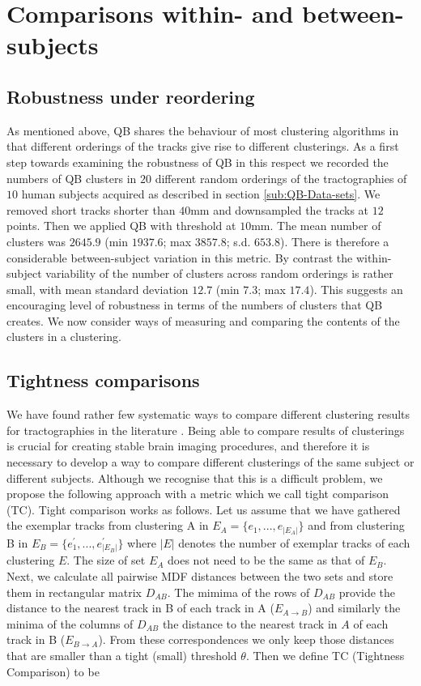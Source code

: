 \documentclass[preprint,authoryear,a4paper,10pt,onecolumn]{elsarticle}
\begin{document}
\section{Comparisons within- and between-subjects\label{sub:Comparisons}}

\subsection{Robustness under reordering}

As mentioned above, QB shares the behaviour of most clustering
algorithms in that different orderings of the tracks give rise to
different clusterings.  As a first step towards examining the robustness
of QB in this respect we recorded the numbers of QB clusters in $20$
different random orderings of the tractographies of $10$ human subjects
acquired as described in section \ref{sub:QB-Data-sets}. We removed
short tracks shorter than $40$mm and downsampled the tracks at $12$
points. Then we applied QB with threshold at $10$mm. The mean number of
clusters was $2645.9$ (min $1937.6$; max $3857.8$; s.d. $653.8$). There
is therefore a considerable between-subject variation in this metric. By
contrast the within-subject variability of the number of clusters across
random orderings is rather small, with mean standard deviation $12.7$
(min $7.3$; max $17.4$). This suggests an encouraging level of
robustness in terms of the numbers of clusters that QB creates. We now
consider ways of measuring and comparing the contents of the clusters in
a clustering.


\subsection{Tightness comparisons\label{sub:Tightness-comparisons-1}}

We have found rather few systematic ways to compare different clustering
results for tractographies in the literature
\citep{moberts2005evaluation}.  Being able to compare results of
clusterings is crucial for creating stable brain imaging procedures, and
therefore it is necessary to develop a way to compare different
clusterings of the same subject or different subjects. Although we
recognise that this is a difficult problem, we propose the following
approach with a metric which we call tight comparison (TC). Tight
comparison works as follows. Let us assume that we have gathered the
exemplar tracks from clustering A in $E_{A}=\{e_{1},...,e_{|E_{A}|}\}$
and from clustering B in $E_{B}=\{e_{1}^{'},...,e_{|E_{B}|}^{'}\}$
where $|E|$ denotes the number of exemplar tracks of each clustering
$E$. The size of set $E_{A}$ does not need to be the same as that of
$E_{B}$. Next, we calculate all pairwise MDF distances
between the two sets and store them in rectangular matrix $D_{AB}$. The
mimima of the rows of $D_{AB}$ provide the distance to the nearest track
in B of each track in A ($E_{A\rightarrow B}$) and similarly
the minima of the columns of $D_{AB}$ the distance to the nearest track
in $A$ of each track in B ($E_{B\rightarrow A}$). From these
correspondences we only keep those distances that are smaller than a
tight (small) threshold $\theta$. Then we define TC (Tightness
Comparison) to be
\end{document}
